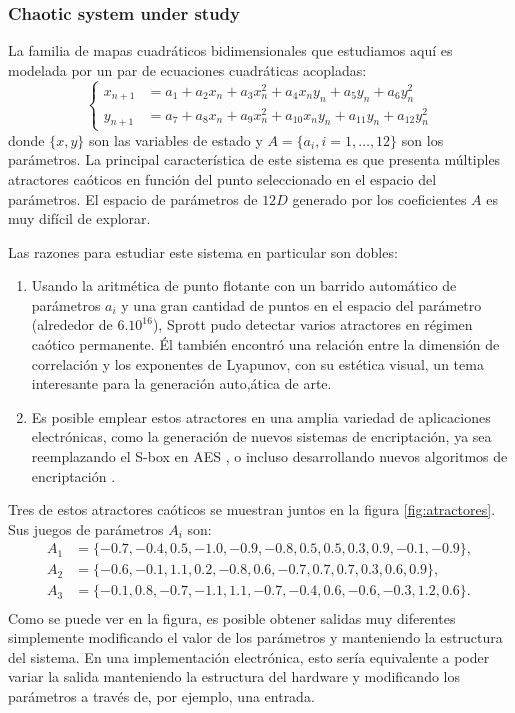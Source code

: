 \subsubsection{Chaotic system under study}  \label{sec:chaos}

La familia de mapas cuadráticos bidimensionales que estudiamos aquí es modelada por un par de ecuaciones cuadráticas acopladas:
%
\begin{equation}\label{eq:mapaSprott}
 \left\{\begin{aligned}
        x_{n+1}&=a_1+a_2 x_n+a_3 x_n^2+a_4 x_n y_n+a_5 y_n+a_6 y_n^2\\
        y_{n+1}&=a_7+a_8 x_n+a_9 x_n^2+a_{10} x_n y_n+a_{11} y_n+a_{12} y_n^2
       \end{aligned}
 \right.
\end{equation}
%
donde $\{x, y\}$ son las variables de estado y $A = \{a_i, i = 1, \dots, 12 \}$ son los parámetros.
La principal característica de este sistema es que presenta múltiples atractores caóticos en función del punto seleccionado en el espacio del parámetros.
El espacio de parámetros de $12D$ generado por los coeficientes $A$ es muy difícil de explorar.

Las razones para estudiar este sistema en particular son dobles:
%
\begin{enumerate}
\item Usando la aritmética de punto flotante con un barrido automático de parámetros $a_i$ y una gran cantidad de puntos en el espacio del parámetro (alrededor de $6. 10 ^ {16}$), Sprott pudo detectar varios atractores en régimen caótico permanente.
Él también encontró una relación entre la dimensión de correlación y los exponentes de Lyapunov, con su estética visual, un tema interesante para la generación auto,ática de arte.
\item Es posible emplear estos atractores en una amplia variedad de aplicaciones electrónicas, como la generación de nuevos sistemas de encriptación, ya sea reemplazando el S-box en AES \cite{Ahmad2013, Hussain2013}, o incluso desarrollando nuevos algoritmos de encriptación \cite{Machado2004, Smaoui2009}.
\end{enumerate}

Tres de estos atractores caóticos se muestran juntos en la figura \ref{fig:atractores}.
Sus juegos de parámetros $A_i$ son:
%
\begin{align*}
A_1&=\{-0.7,-0.4,0.5,-1.0,-0.9,-0.8,0.5,0.5,0.3,0.9,-0.1,-0.9\},\nonumber\\
A_2&=\{-0.6,-0.1,1.1,0.2,-0.8,0.6,-0.7,0.7,0.7,0.3,0.6,0.9\}, \nonumber\\
A_3&=\{ -0.1,0.8,-0.7,-1.1,1.1,-0.7,-0.4,0.6,-0.6,-0.3,1.2,0.6\}.\nonumber\\
\end{align*}
%
Como se puede ver en la figura, es posible obtener salidas muy diferentes simplemente modificando el valor de los parámetros y manteniendo la estructura del sistema.
En una implementación electrónica, esto sería equivalente a poder variar la salida manteniendo la estructura del hardware y modificando los parámetros a través de, por ejemplo, una entrada.


